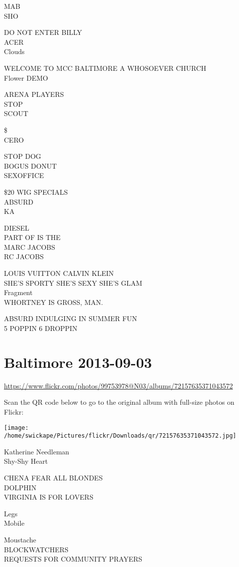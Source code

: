 \documentclass[10pt,letterpaper]{article}
\begin{document}
MAB\\
SHO

DO NOT ENTER BILLY\\
ACER\\
Clouds

WELCOME TO MCC BALTIMORE A WHOSOEVER CHURCH\\
Flower DEMO

ARENA PLAYERS\\
STOP\\
SCOUT

\$\\
CERO

STOP DOG\\
BOGUS DONUT\\
SEXOFFICE

\$20 WIG SPECIALS\\
ABSURD\\
KA

DIESEL\\
PART OF IS THE\\
MARC JACOBS\\
RC JACOBS

LOUIS VUITTON CALVIN KLEIN\\
SHE'S SPORTY SHE'S SEXY SHE'S GLAM\\
Fragment\\
WHORTNEY IS GROSS, MAN.

ABSURD INDULGING IN SUMMER FUN\\
5 POPPIN 6 DROPPIN
\pagebreak

\section*{Baltimore 2013-09-03}

\url{https://www.flickr.com/photos/99753978@N03/albums/72157635371043572}

Scan the QR code below to go to the original album with full-size photos on Flickr:

\texttt{[image: /home/swickape/Pictures/flickr/Downloads/qr/72157635371043572.jpg]}
\pagebreak

Katherine Needleman\\
Shy{-}Shy Heart

CHENA FEAR ALL BLONDES\\
DOLPHIN\\
VIRGINIA IS FOR LOVERS

Legs\\
Mobile

Moustache\\
BLOCKWATCHERS\\
REQUESTS FOR COMMUNITY PRAYERS
\end{document}
